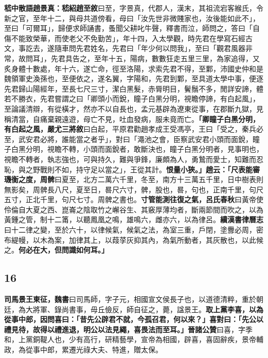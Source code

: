 \textbf{嵇中散語趙景真：}{\footnotesize \textbf{嵇紹趙至敘}曰至，字景真，代郡人，漢末，其祖流宕客緱氏，令新之官，至年十二，與母共道傍看，母曰「汝先世非微賤家也，汝後能如此不」，至曰「可爾耳」，歸便求師誦書，蚤聞父耕叱牛聲，釋書而泣，師問之，答曰「自傷不能致榮華，而使老父不免勤苦」，年十四，入太學觀，時先君在學寫石經古文，事訖去，遂隨車問先君姓名，先君曰「年少何以問我」，至曰「觀君風器非常，故問耳」，先君具告之，至年十五，陽病，數數狂走五里三里，為家追得，又炙身體十數處，年十六，遂亡命，徑至洛陽，求索先君不得，至鄴，沛國史仲和是魏領軍史渙孫也，至便依之，遂名翼，字陽和，先君到鄴，至具道太學中事，便逐先君歸山陽經年，至長七尺三寸，潔白黑髮，赤脣明目，鬢鬚不多，閒詳安諦，體若不勝衣，先君嘗謂之曰「卿頭小而銳，瞳子白黑分明，視瞻停諦，有白起風」，至論議清辯，有從橫才，然亦不以自長也，孟元基辟為遼東從事，在郡斷九獄，見稱清當，自痛棄親遠遊，母亡不見，吐血發病，服未竟而亡。}\textbf{「卿瞳子白黑分明，有白起之風，}{\footnotesize \textbf{嚴尤三將敘}曰白起，平原君勸趙孝成王受馮亭，王曰「受之，秦兵必至，武安君必將，誰能當之者乎」，對曰「澠池之會，臣察武安君小頭而面銳，瞳子白黑分明，視瞻不轉，小頭而面銳者，敢斷決也，瞳子白黑分明者，見事明也，視瞻不轉者，執志強也，可與持久，難與爭鋒，廉頗為人，勇鷙而愛士，知難而忍恥，與之野戰則不如，持守足以當之」，王從其計。}\textbf{恨量小狹。」趙云：「尺表能審璣衡之度，}{\footnotesize \textbf{周髀}曰夏至，北方二萬六千里，冬至，南方十三萬五千里，日中樹表則無影矣，周髀長八尺，夏至日，晷尺六寸，髀，股也，晷，句也，正南千里，句尺五寸，正北千里，句尺七寸。周髀之書也。}\textbf{寸管能測往復之氣，}{\footnotesize \textbf{呂氏春秋}曰黃帝使伶倫自大夏之西、崑崙之陰取竹之嶰谷生、其竅厚薄均者，斷兩節間而吹之，以為黃鍾之管，制十二筩，以聽鳳凰之鳴，雄鳴六，雌亦六，以為律呂。\textbf{續漢書律曆志}曰十二律之變，至於六十，以律候氣，候氣之法，為室三重，戶閉，塗釁必周，密布緹幔，以木為案，加律其上，以葭莩灰抑其內，為氣所動者，其灰散也，以此候之。}\textbf{何必在大，但問識如何耳。」}

\subsection*{16}

\textbf{司馬景王東征，}{\footnotesize \textbf{魏書}曰司馬師，字子元，相國宣文侯長子也，以道德清粹，重於朝廷，為大將軍、錄尚書事，毋丘儉反，師自征之，薨，諡景王。}\textbf{取上黨李喜，以為從事中郎，因問喜曰：「昔先公辟君不就，今孤召君，何以來？」喜對曰：「先公以禮見待，故得以禮進退，明公以法見繩，喜畏法而至耳。」}{\footnotesize \textbf{晉諸公贊}曰喜，字季和，上黨銅鞮人也，少有高行，研精藝學，宣帝為相國，辟喜，喜固辭疾，景帝輔政，為從事中郎，累遷光祿大夫、特進，贈太保。}

